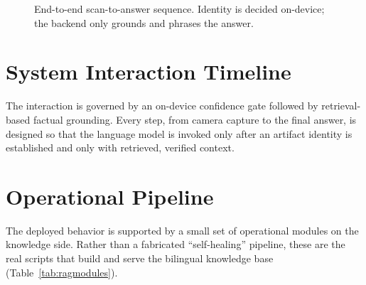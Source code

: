 \begin{figure}[htbp]
\centering
{}
\caption{End-to-end scan-to-answer sequence. Identity is decided on-device; the backend
only grounds and phrases the answer.}
\label{fig:sequence}
\end{figure}

\section{System Interaction Timeline}

The interaction is governed by an on-device confidence gate followed by
retrieval-based factual grounding. Every step, from camera capture to the final
answer, is designed so that the language model is invoked only after an artifact
identity is established and only with retrieved, verified context.

\section{Operational Pipeline}

The deployed behavior is supported by a small set of operational modules on the
knowledge side. Rather than a fabricated ``self-healing'' pipeline, these are the real
scripts that build and serve the bilingual knowledge base
(Table~\ref{tab:ragmodules}).

